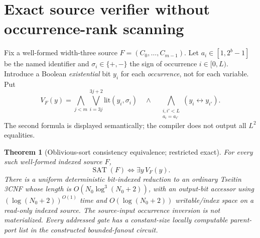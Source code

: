 \documentclass[11pt]{article}
\newtheorem{theorem}{Theorem}
\begin{document}
\section{Exact source verifier without occurrence-rank scanning}
Fix a well-formed width-three source $F=(C_0,\ldots,C_{m-1})$. Let $a_i\in[1,2^b-1]$ be the named identifier and $\sigma_i\in\{+,-\}$ the sign of occurrence $i\in[0,L)$. Introduce a Boolean \emph{existential} bit $y_i$ for each \emph{occurrence}, not for each variable. Put
\[
V_F(y)=\bigwedge_{j<m}\bigvee_{i=3j}^{3j+2}\mathrm{lit}(y_i,\sigma_i)
\quad\wedge\quad
\bigwedge_{\substack{i,i'<L\\a_i=a_{i'}}}(y_i\leftrightarrow y_{i'}).
\]
The second formula is displayed semantically; the compiler does not output all $L^2$ equalities.

\begin{theorem}[Oblivious-sort consistency equivalence; restricted exact]
For every such well-formed indexed source $F$,
\[
\boxed{\operatorname{SAT}(F)\iff \exists y\,V_F(y).}
\]
There is a uniform deterministic bit-indexed reduction to an ordinary Tseitin 3CNF whose length is $O(N_0\log^3(N_0+2))$, with an output-bit accessor using $(\log(N_0+2))^{O(1)}$ time and $O(\log(N_0+2))$ writable/index space on a read-only indexed source. The source-input occurrence inversion is not materialized. Every addressed gate has a constant-size \emph{locally computable} parent-port list in the constructed bounded-fanout circuit.
\end{theorem}
\end{document}
